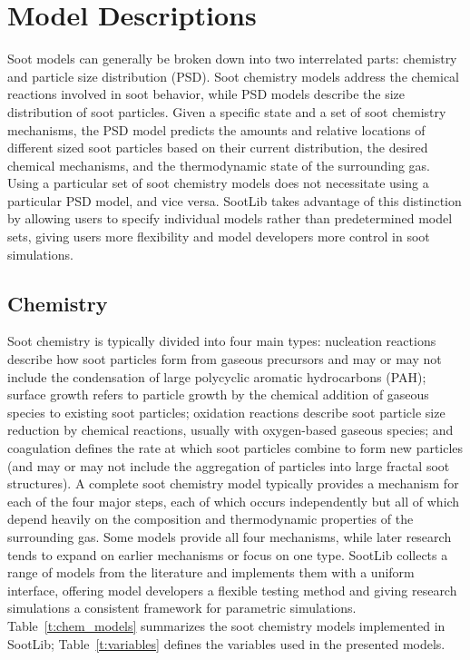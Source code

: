 \documentclass[preprint,12pt,letterpaper]{elsarticle}
\begin{document}

\section{Model Descriptions}
\label{s:models}

Soot models can generally be broken down into two interrelated parts: chemistry and particle size distribution (PSD). Soot chemistry models address the chemical reactions involved in soot behavior, while PSD models describe the size distribution of soot particles. Given a specific state and a set of soot chemistry mechanisms, the PSD model predicts the amounts and relative locations of different sized soot particles based on their current distribution, the desired chemical mechanisms, and the thermodynamic state of the surrounding gas. Using a particular set of soot chemistry models does not necessitate using a particular PSD model, and vice versa. SootLib takes advantage of this distinction by allowing users to specify individual models rather than predetermined model sets, giving users more flexibility and model developers more control in soot simulations.

\subsection{Chemistry}
\label{ss:chemistry}

Soot chemistry is typically divided into four main types: nucleation reactions describe how soot particles form from gaseous precursors and may or may not include the condensation of large polycyclic aromatic hydrocarbons (PAH); surface growth refers to particle growth by the chemical addition of gaseous species to existing soot particles; oxidation reactions describe soot particle size reduction by chemical reactions, usually with oxygen-based gaseous species; and coagulation defines the rate at which soot particles combine to form new particles (and may or may not include the aggregation of particles into large fractal soot structures). A complete soot chemistry model typically provides a mechanism for each of the four major steps, each of which occurs independently but all of which depend heavily on the composition and thermodynamic properties of the surrounding gas. Some models provide all four mechanisms, while later research tends to expand on earlier mechanisms or focus on one type. SootLib collects a range of models from the literature and implements them with a uniform interface, offering model developers a flexible testing method and giving research simulations a consistent framework for parametric simulations. Table~\ref{t:chem_models} summarizes the soot chemistry models implemented in SootLib;  Table~\ref{t:variables} defines the variables used in the presented models.
\end{document}
